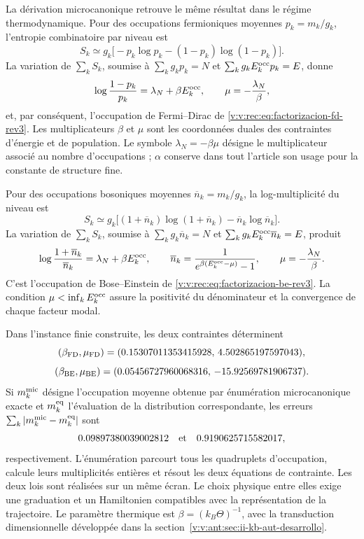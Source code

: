 La dérivation microcanonique retrouve le même résultat dans le régime
thermodynamique. Pour des occupations fermioniques moyennes
\(p_k=m_k/g_k\), l’entropie combinatoire par niveau est
\begin{equation}
 S_k\simeq
 g_k\bigl[-p_k\log p_k-(1-p_k)\log(1-p_k)\bigr].
 \label{v:v:rec:eq:entropia-fd-nivel-rev3}
\end{equation}
La variation de \(\sum_kS_k\), soumise à
\(\sum_kg_kp_k=N\) et
\(\sum_kg_kE_k^{\rm occ}p_k=E\), donne
\begin{equation}
 \log\frac{1-p_k}{p_k}=\lambda_N+\beta E_k^{\rm occ},
 \qquad
 \mu=-\frac{\lambda_N}{\beta},
 \label{v:v:rec:eq:variacion-fd-rev3}
\end{equation}
et, par conséquent, l’occupation de Fermi--Dirac de
\eqref{v:v:rec:eq:factorizacion-fd-rev3}. Les multiplicateurs \(\beta\) et \(\mu\)
sont les coordonnées duales des contraintes d’énergie et de population.
Le symbole \(\lambda_N=-\beta\mu\) désigne le multiplicateur associé au
nombre d’occupations ; \(\alpha\) conserve dans tout l’article son usage
pour la constante de structure fine.

Pour des occupations bosoniques moyennes
\(\overline n_k=m_k/g_k\), la log-multiplicité du niveau est
\begin{equation}
 S_k\simeq
 g_k\bigl[(1+\overline n_k)\log(1+\overline n_k)
          -\overline n_k\log\overline n_k\bigr].
 \label{v:v:rec:eq:entropia-be-nivel-rev3}
\end{equation}
La variation de \(\sum_kS_k\), soumise à
\(\sum_kg_k\overline n_k=N\) et
\(\sum_kg_kE_k^{\rm occ}\overline n_k=E\), produit
\begin{equation}
 \log\frac{1+\overline n_k}{\overline n_k}
 =\lambda_N+\beta E_k^{\rm occ},
 \qquad
 \overline n_k
 =\frac{1}{e^{\beta(E_k^{\rm occ}-\mu)}-1},
 \qquad
 \mu=-\frac{\lambda_N}{\beta}.
 \label{v:v:rec:eq:variacion-be-rev3}
\end{equation}
C’est l’occupation de Bose--Einstein de
\eqref{v:v:rec:eq:factorizacion-be-rev3}. La condition
\(\mu<\inf_kE_k^{\rm occ}\) assure la positivité du dénominateur et la
convergence de chaque facteur modal.

Dans l’instance finie construite, les deux contraintes déterminent
\[
 (\beta_{\rm FD},\mu_{\rm FD})
 =(0.15307011353415928,\,4.502865197597043),
\]
\[
 (\beta_{\rm BE},\mu_{\rm BE})
 =(0.05456727960068316,\,-15.92569781906737).
\]
Si \(m_k^{\rm mic}\) désigne l’occupation moyenne obtenue par énumération
microcanonique exacte et \(m_k^{\rm eq}\) l’évaluation de la distribution
correspondante, les erreurs
\(\sum_k|m_k^{\rm mic}-m_k^{\rm eq}|\) sont
\[
 0.09897380039002812\quad\hbox{et}\quad
 0.9190625715582017,
\]
respectivement. L’énumération parcourt tous les quadruplets d’occupation,
calcule leurs multiplicités entières et résout les deux équations de
contrainte. Les deux lois sont réalisées sur un même écran. Le choix
physique entre elles exige une graduation et un Hamiltonien compatibles avec la
représentation de la trajectoire. Le paramètre thermique est
\(\beta=(k_B\Theta)^{-1}\), avec la transduction dimensionnelle développée dans
la section~\ref{v:v:ant:sec:ii-kb-aut-desarrollo}.

